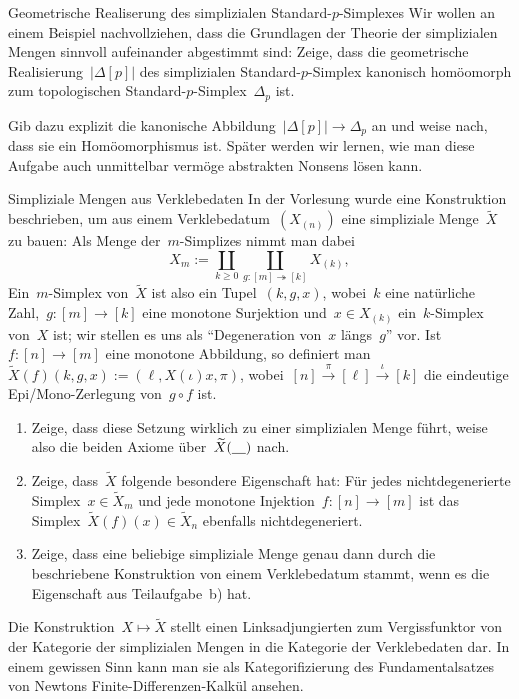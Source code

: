 \documentclass{uebblatt}
\begin{document}

\begin{aufgabe}{Geometrische Realiserung des simplizialen
Standard-$p$-Simplexes}
Wir wollen an einem Beispiel nachvollziehen, dass die Grundlagen
der Theorie der simplizialen Mengen sinnvoll aufeinander abgestimmt sind:
Zeige, dass die geometrische Realisierung~$|\Delta[p]|$ des simplizialen
Standard-$p$-Simplex kanonisch homöomorph zum topologischen
Standard-$p$-Simplex~$\Delta_p$ ist.

Gib dazu explizit die kanonische Abbildung~$|\Delta[p]| \to \Delta_p$ an und
weise nach, dass sie ein Homöomorphismus ist. Später werden wir lernen, wie man
diese Aufgabe auch unmittelbar vermöge abstrakten Nonsens lösen kann.
\end{aufgabe}

\begin{aufgabe}{Simpliziale Mengen aus Verklebedaten}
In der Vorlesung wurde eine Konstruktion beschrieben, um aus einem
Verklebedatum~$(X_{(n)})$ eine simpliziale Menge~$\widetilde X$ zu bauen: Als
Menge der~$m$-Simplizes nimmt man dabei
\[ X_m := \coprod_{k \geq 0} \coprod_{g : [m] \twoheadrightarrow [k]} X_{(k)}, \]
Ein~$m$-Simplex von~$\widetilde X$ ist also ein Tupel~$(k,g,x)$, wobei~$k$ eine
natürliche Zahl,~$g : [m] \to [k]$ eine monotone Surjektion und~$x \in X_{(k)}$
ein~$k$-Simplex von~$X$ ist; wir stellen es uns als "`Degeneration von~$x$
längs~$g$"' vor. Ist~$f : [n] \to [m]$ eine monotone Abbildung, so definiert
man~$\widetilde X(f)(k,g,x) := (\ell, X(\iota)x, \pi)$, wobei~$[n]
\xrightarrow{\pi} [\ell] \xrightarrow{\iota} [k]$ die eindeutige Epi/Mono-Zerlegung
von~$g \circ f$ ist.
\begin{enumerate}
\item Zeige, dass diese Setzung wirklich zu einer simplizialen Menge führt,
weise also die beiden Axiome über~$\widetilde X(\underline{\quad})$ nach.
\item Zeige, dass~$\widetilde X$ folgende besondere Eigenschaft hat: Für jedes
nichtdegenerierte Simplex~$x \in \widetilde X_m$ und jede monotone Injektion~$f
: [n] \to [m]$ ist das Simplex~$\widetilde X(f)(x) \in \widetilde X_n$
ebenfalls nichtdegeneriert.
\item Zeige, dass eine beliebige simpliziale Menge genau dann durch die
beschriebene Konstruktion von einem Verklebedatum stammt, wenn es die
Eigenschaft aus Teilaufgabe~b) hat.
\end{enumerate}

Die Konstruktion~$X \mapsto \widetilde X$ stellt einen Linksadjungierten zum
Vergissfunktor von der Kategorie der simplizialen Mengen in die Kategorie der
Verklebedaten dar. In einem gewissen Sinn kann man sie als Kategorifizierung
des Fundamentalsatzes von Newtons Finite-Differenzen-Kalkül ansehen.
\end{aufgabe}
\end{document}
